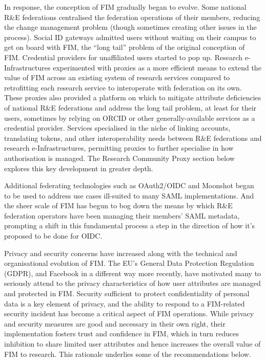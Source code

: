 \documentclass[fleqn,10pt]{wlscirep}
\begin{document}
{In response, the conception of FIM gradually began to evolve. Some national R\&E federations centralised the federation operations of their members, reducing the change management problem (though sometimes creating other issues in the process). Social ID gateways admitted users without waiting on their campus to get on board with FIM, the “long tail” problem of the original conception of FIM. Credential providers for unaffiliated users started to pop up. Research e-Infrastructures experimented with proxies as a more efficient means to extend the value of FIM across an existing system of research services compared to retrofitting each research service to interoperate with federation on its own. These proxies also provided a platform on which to mitigate attribute deficiencies of national R\&E federations and address the long tail problem, at least for their users, sometimes by relying on ORCID\cite{orcid} or other generally-available services as a credential provider. Services specialised in the niche of linking accounts, translating tokens, and other interoperability needs between R\&E federations and research e-Infrastructures, permitting proxies to further specialise in how authorisation is managed. The Research Community Proxy section below explores this key development in greater depth.

Additional federating technologies such as OAuth2/OIDC\cite{oidc} and Moonshot\cite{moonshot} began to be used to address use cases ill-suited to many SAML implementations. And the sheer scale of FIM has begun to bog down the means by which R\&E federation operators have been managing their members’ SAML metadata, prompting a shift in this fundamental process a step in the direction of how it’s proposed to be done for OIDC\cite{oidcfed}. 

Privacy and security concerns have increased along with the technical and organisational evolution of FIM. The EU’s General Data Protection Regulation (GDPR)\cite{GDPR:2016}\cite{eugdpr}, and Facebook in a different way more recently, have motivated many to seriously attend to the privacy characteristics of how user attributes are managed and protected in FIM\cite{assessdp}\cite{attributerelease}\cite{baseline}\cite{dpcoco}. Security sufficient to protect confidentiality of personal data is a key element of privacy, and the ability to respond to a FIM-related security incident has become a critical aspect of FIM operations\cite{sirtfi}. While privacy and security measures are good and necessary in their own right, their implementation fosters trust and confidence in FIM, which in turn reduces inhibition to share limited user attributes and hence increases the overall value of FIM to research. This rationale underlies some of the recommendations below.

}
\end{document}
